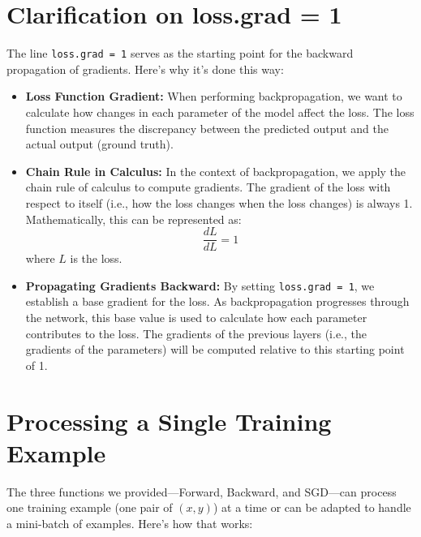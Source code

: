 \documentclass{article}
\begin{document}
\section{Clarification on loss.grad = 1}

The line \texttt{loss.grad = 1} serves as the starting point for the backward propagation of gradients. Here’s why it’s done this way:

\begin{itemize}
    \item \textbf{Loss Function Gradient:} When performing backpropagation, we want to calculate how changes in each parameter of the model affect the loss. The loss function measures the discrepancy between the predicted output and the actual output (ground truth).
    
    \item \textbf{Chain Rule in Calculus:} In the context of backpropagation, we apply the chain rule of calculus to compute gradients. The gradient of the loss with respect to itself (i.e., how the loss changes when the loss changes) is always 1. Mathematically, this can be represented as:
    \[
    \frac{dL}{dL} = 1
    \]
    where \(L\) is the loss.
    
    \item \textbf{Propagating Gradients Backward:} By setting \texttt{loss.grad = 1}, we establish a base gradient for the loss. As backpropagation progresses through the network, this base value is used to calculate how each parameter contributes to the loss. The gradients of the previous layers (i.e., the gradients of the parameters) will be computed relative to this starting point of 1.
\end{itemize}

\section{Processing a Single Training Example}
The three functions we provided—Forward, Backward, and SGD—can process one training example (one pair of \((x,y)\)) at a time or can be adapted to handle a mini-batch of examples. Here’s how that works:
\end{document}
